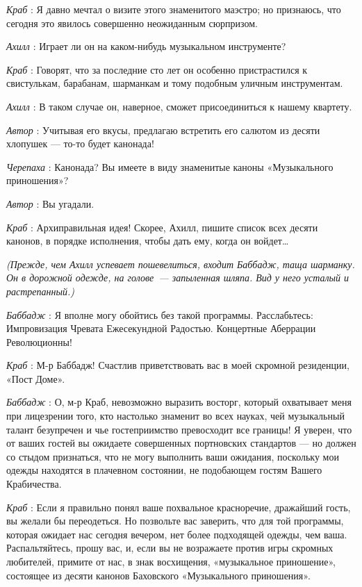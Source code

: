 \documentclass[../main.tex]{subfiles}
\begin{document}
\begin{dialogue}
\emph{Краб} : Я давно мечтал о визите этого знаменитого маэстро; но признаюсь, что сегодня это явилось совершенно неожиданным сюрпризом.

\emph{Ахилл} : Играет ли он на каком-нибудь музыкальном инструменте?

\emph{Краб} : Говорят, что за последние сто лет он особенно пристрастился к свистулькам, барабанам, шарманкам и тому подобным уличным инструментам.

\emph{Ахилл} : В таком случае он, наверное, сможет присоединиться к нашему квартету.

\emph{Автор} : Учитывая его вкусы, предлагаю встретить его салютом из десяти хлопушек --- то-то будет канонада!

\emph{Черепаха} : Канонада? Вы имеете в виду знаменитые каноны «Музыкального приношения»?

\emph{Автор} : Вы угадали.

\emph{Краб} : Архиправильная идея! Скорее, Ахилл, пишите список всех десяти канонов, в порядке исполнения, чтобы дать ему, когда он войдет\ldots{}

\emph{(Прежде, чем Ахилл успевает пошевелиться, входит Баббадж, таща шарманку. Он в дорожной одежде, на голове~--- запыленная шляпа. Вид у него усталый и растрепанный.)}

\emph{Баббадж} : Я вполне могу обойтись без такой программы. Расслабьтесь: Импровизация Чревата Ежесекундной Радостью. Концертные Аберрации Революционны!

\emph{Краб} : М-р Баббадж! Счастлив приветствовать вас в моей скромной резиденции, «Пост Доме».

\emph{Баббадж} : О, м-р Краб, невозможно выразить восторг, который охватывает меня при лицезрении того, кто настолько знаменит во всех науках, чей музыкальный талант безупречен и чье гостеприимство превосходит все границы! Я уверен, что от ваших гостей вы ожидаете совершенных портновских стандартов --- но должен со стыдом признаться, что не могу выполнить ваши ожидания, поскольку мои одежды находятся в плачевном состоянии, не подобающем гостям Вашего Крабичества.

\emph{Краб} : Если я правильно понял ваше похвальное красноречие, дражайший гость, вы желали бы переодеться. Но позвольте вас заверить, что для той программы, которая ожидает нас сегодня вечером, нет более подходящей одежды, чем ваша. Распальтяйтесь, прошу вас, и, если вы не возражаете против игры скромных любителей, примите от нас, в знак восхищения, «музыкальное приношение», состоящее из десяти канонов Баховского «Музыкального приношения».


\end{dialogue}
\end{document}
